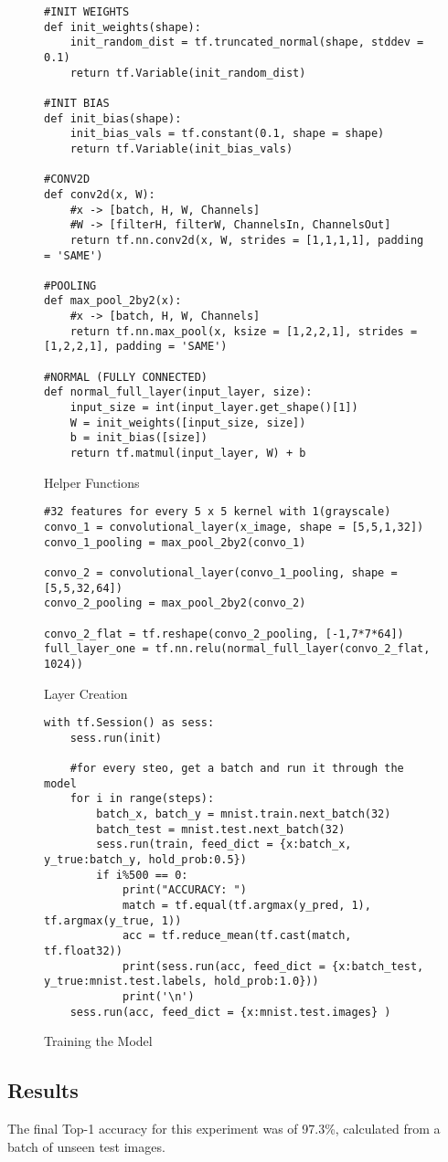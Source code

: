 \begin{figure}[h]
\caption{Helper Functions \parencite{udemy}}
\label{lst:helperFunctions}
\begin{lstlisting}[style=Python]
#INIT WEIGHTS
def init_weights(shape):
    init_random_dist = tf.truncated_normal(shape, stddev = 0.1)
    return tf.Variable(init_random_dist)

#INIT BIAS
def init_bias(shape):
    init_bias_vals = tf.constant(0.1, shape = shape)
    return tf.Variable(init_bias_vals)

#CONV2D
def conv2d(x, W):
    #x -> [batch, H, W, Channels]
    #W -> [filterH, filterW, ChannelsIn, ChannelsOut]
    return tf.nn.conv2d(x, W, strides = [1,1,1,1], padding = 'SAME')

#POOLING
def max_pool_2by2(x):
    #x -> [batch, H, W, Channels]
    return tf.nn.max_pool(x, ksize = [1,2,2,1], strides = [1,2,2,1], padding = 'SAME')

#NORMAL (FULLY CONNECTED)
def normal_full_layer(input_layer, size):
    input_size = int(input_layer.get_shape()[1])
    W = init_weights([input_size, size])
    b = init_bias([size])
    return tf.matmul(input_layer, W) + b
\end{lstlisting}
\end{figure}

\begin{figure}[h]
\caption{Layer Creation \parencite{udemy}}
\label{lst:layerCreation}
\begin{lstlisting}[style=Python]
#32 features for every 5 x 5 kernel with 1(grayscale)
convo_1 = convolutional_layer(x_image, shape = [5,5,1,32])
convo_1_pooling = max_pool_2by2(convo_1)

convo_2 = convolutional_layer(convo_1_pooling, shape = [5,5,32,64])
convo_2_pooling = max_pool_2by2(convo_2)

convo_2_flat = tf.reshape(convo_2_pooling, [-1,7*7*64])
full_layer_one = tf.nn.relu(normal_full_layer(convo_2_flat, 1024))
\end{lstlisting}
\end{figure}

\begin{figure}[h]
\caption{Training the Model \parencite{udemy}}
\label{lst:trainingModel1}
\begin{lstlisting}[style=Python]
with tf.Session() as sess:
    sess.run(init)
    
    #for every steo, get a batch and run it through the model
    for i in range(steps):
        batch_x, batch_y = mnist.train.next_batch(32)
        batch_test = mnist.test.next_batch(32)
        sess.run(train, feed_dict = {x:batch_x, y_true:batch_y, hold_prob:0.5})
        if i%500 == 0:
            print("ACCURACY: ")
            match = tf.equal(tf.argmax(y_pred, 1), tf.argmax(y_true, 1))
            acc = tf.reduce_mean(tf.cast(match, tf.float32))
            print(sess.run(acc, feed_dict = {x:batch_test, y_true:mnist.test.labels, hold_prob:1.0}))
            print('\n')     
    sess.run(acc, feed_dict = {x:mnist.test.images} )
\end{lstlisting}
\end{figure}

\tocless\subsection{Results}
The final Top-1 accuracy for this experiment was of 97.3\%, calculated from a batch of unseen test images.

\clearpage